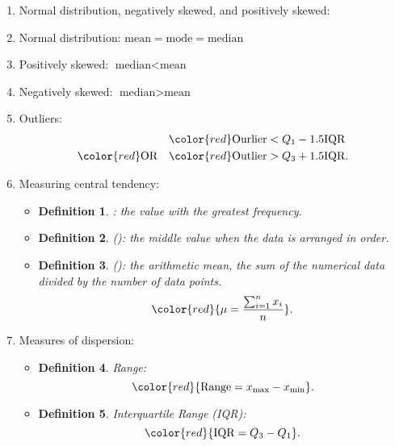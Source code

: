 \documentclass[12pt, a4paper]{article}
\newtheorem{definition}{Definition}[subsection]
\begin{document}
\begin{enumerate}
\begin{itemize}
        \item Box-and-whisker plots: $\rightarrow$ spread of data: 
        \begin{figure}[H]
            \center
            \texttt{[image: Fig.4.4.jpg]}
        \end{figure}
    \end{itemize}
    \item Normal distribution, negatively skewed, and positively skewed: 
    \item Normal distribution: $\text{mean}=\text{mode}=\text{median}$
    \item Positively skewed: $\text{median}<\text{mean}$
    \item Negatively skewed: $\text{median}>\text{mean}$
    \item Outliers: 
    $$\begin{aligned}
        &\color{red}\text{Ourlier}<Q_1-1.5\text{IQR}\\
    {\color{red}\text{OR}\quad}&{\color{red}\text{Outlier}>Q_3+1.5\text{IQR}}.
    \end{aligned}$$
    \item Measuring central tendency: 
    \begin{itemize}
        \item \begin{definition} \textbf{\color{red}{Mode}}: the value with the greatest frequency. \end{definition}
        \item \begin{definition}\textbf{\color{red}{Median}}({\color{red}{$m$}}): the middle value when the data is arranged in order.\end{definition}
        \item \begin{definition}\textbf{\color{red}{Mean}}({\color{red}{$\mu$}}): the arithmetic mean, the sum of the numerical data divided by the number of data points. 
        $${\color{red}{\mu=\frac{\sum^{n}_{i=1}x_i}{n}}}.$$\end{definition}
    \end{itemize}
    \item Measures of dispersion: 
    \begin{itemize}
        \item \begin{definition}Range: $${\color{red}{\text{Range}=x_\text{max}-x_\text{min}}}.$$\end{definition}
        \item \begin{definition}Interquartile Range (IQR): $${\color{red}{\text{IQR}=Q_3-Q_1}}.$$\end{definition}

\end{itemize}
\end{enumerate}
\end{document}
